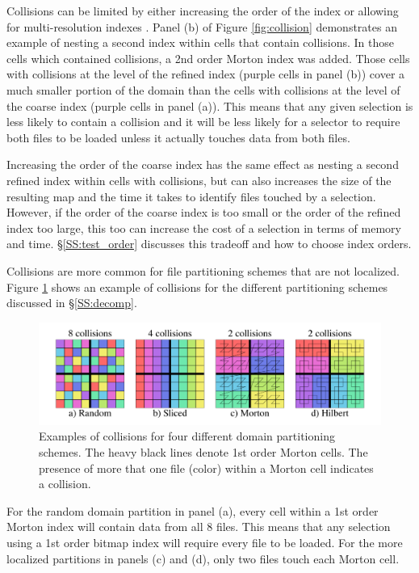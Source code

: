 \documentclass[apjl]{emulateapj}
\begin{document}
Collisions can be limited by either increasing the order of the index or allowing for multi-resolution indexes \citep{Sinha2006,Sinha2007}. Panel (b) of Figure \ref{fig:collision} demonstrates an example of nesting a second index within cells that contain collisions. In those cells which contained collisions, a 2nd order Morton index was added. Those cells with collisions at the level of the refined index (purple cells in panel (b)) cover a much smaller portion of the domain than the cells with collisions at the level of the coarse index (purple cells in panel (a)). This means that any given selection is less likely to contain a collision and it will be less likely for a selector to require both files to be loaded unless it actually touches data from both files.

Increasing the order of the coarse index has the same effect as nesting a second refined index within cells with collisions, but can also increases the size of the resulting map and the time it takes to identify files touched by a selection. However, if the order of the coarse index is too small or the order of the refined index too large, this too can increase the cost of a selection in terms of memory and time. \S\ref{SS:test_order} discusses this tradeoff and how to choose index orders.

Collisions are more common for file partitioning schemes that are not localized. Figure \ref{fig:collision_files} shows an example of collisions for the different partitioning schemes discussed in \S\ref{SS:decomp}.
%
\ifinclfig
	\begin{figure}[htbp]
	\begin{center}
	\includegraphics[width=\columnwidth,keepaspectratio]{../images/index.png}
	\caption{Examples of collisions for four different domain partitioning schemes. The heavy black lines denote 1st order Morton cells. The presence of more that one file (color) within a Morton cell indicates a collision.}
	\label{fig:collision_files}
	\end{center}
	\end{figure}
\fi
%
For the random domain partition in panel (a), every cell within a 1st order Morton index will contain data from all 8 files. This means that any selection using a 1st order bitmap index will require every file to be loaded. For the more localized partitions in panels (c) and (d), only two files touch each Morton cell.
\end{document}
